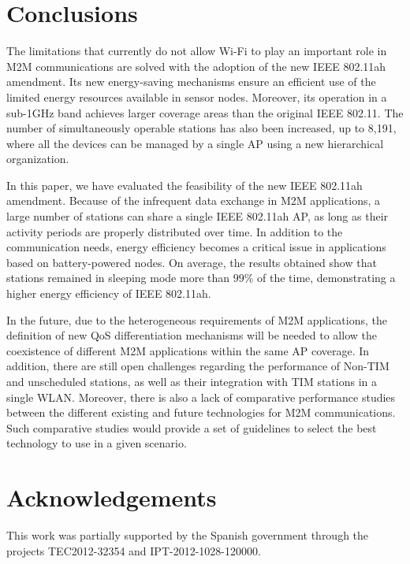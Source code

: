 \documentclass[]{article}
\begin{document}
\section{Conclusions} \label{conclusions}

The limitations that currently do not allow Wi-Fi to play an important role in M2M communications are solved with the adoption of the new IEEE 802.11ah amendment. Its new energy-saving mechanisms ensure an efficient use of the limited energy resources available in sensor nodes. Moreover, its operation in a sub-1GHz band achieves larger coverage areas than  the original IEEE 802.11. The number of simultaneously operable stations has also been increased, up to 8,191, where all the devices can be managed by a single AP using a new hierarchical organization.

In this paper, we have evaluated the feasibility of the new IEEE 802.11ah amendment. Because of the infrequent data exchange in M2M applications, a large number of stations can share a single IEEE 802.11ah AP, as long as their activity periods are properly distributed over time. In addition to the communication needs, energy efficiency becomes a critical issue in applications based on battery-powered nodes. On average, the results obtained show that stations remained in sleeping mode more than $99$\% of the time, demonstrating a higher energy efficiency of IEEE 802.11ah.

In the future, due to the heterogeneous requirements of M2M applications, the definition of new QoS differentiation mechanisms will be needed to allow the coexistence of different M2M applications within the same AP coverage. In addition, there are still open challenges regarding the performance of Non-TIM and unscheduled stations, as well as their integration with TIM stations in a single WLAN. Moreover, there is also a lack of comparative performance studies between the different existing and future technologies for M2M communications. Such comparative studies would provide a set of guidelines to select the best technology to use in a given scenario.

\section*{Acknowledgements}
This work was partially supported by the Spanish government through the projects TEC2012-32354 and IPT-2012-1028-120000.




\end{document}

